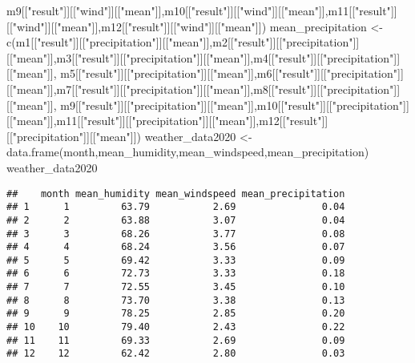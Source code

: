 \documentclass[
]{article}
\newenvironment{Shaded}{\begin{snugshade}}{\end{snugshade}}
\newcommand{\FunctionTok}[1]{\textcolor[rgb]{0.00,0.00,0.00}{#1}}
\newcommand{\NormalTok}[1]{#1}
\newcommand{\OtherTok}[1]{\textcolor[rgb]{0.56,0.35,0.01}{#1}}
\newcommand{\StringTok}[1]{\textcolor[rgb]{0.31,0.60,0.02}{#1}}
\begin{document}
\begin{Shaded}
\begin{Highlighting}[]
\NormalTok{                   m9[[}\StringTok{"result"}\NormalTok{]][[}\StringTok{"wind"}\NormalTok{]][[}\StringTok{"mean"}\NormalTok{]],m10[[}\StringTok{"result"}\NormalTok{]][[}\StringTok{"wind"}\NormalTok{]][[}\StringTok{"mean"}\NormalTok{]],m11[[}\StringTok{"result"}\NormalTok{]][[}\StringTok{"wind"}\NormalTok{]][[}\StringTok{"mean"}\NormalTok{]],m12[[}\StringTok{"result"}\NormalTok{]][[}\StringTok{"wind"}\NormalTok{]][[}\StringTok{"mean"}\NormalTok{]])}
\NormalTok{mean\_precipitation }\OtherTok{\textless{}{-}} \FunctionTok{c}\NormalTok{(m1[[}\StringTok{"result"}\NormalTok{]][[}\StringTok{"precipitation"}\NormalTok{]][[}\StringTok{"mean"}\NormalTok{]],m2[[}\StringTok{"result"}\NormalTok{]][[}\StringTok{"precipitation"}\NormalTok{]][[}\StringTok{"mean"}\NormalTok{]],m3[[}\StringTok{"result"}\NormalTok{]][[}\StringTok{"precipitation"}\NormalTok{]][[}\StringTok{"mean"}\NormalTok{]],m4[[}\StringTok{"result"}\NormalTok{]][[}\StringTok{"precipitation"}\NormalTok{]][[}\StringTok{"mean"}\NormalTok{]],}
\NormalTok{                   m5[[}\StringTok{"result"}\NormalTok{]][[}\StringTok{"precipitation"}\NormalTok{]][[}\StringTok{"mean"}\NormalTok{]],m6[[}\StringTok{"result"}\NormalTok{]][[}\StringTok{"precipitation"}\NormalTok{]][[}\StringTok{"mean"}\NormalTok{]],m7[[}\StringTok{"result"}\NormalTok{]][[}\StringTok{"precipitation"}\NormalTok{]][[}\StringTok{"mean"}\NormalTok{]],m8[[}\StringTok{"result"}\NormalTok{]][[}\StringTok{"precipitation"}\NormalTok{]][[}\StringTok{"mean"}\NormalTok{]],}
\NormalTok{                   m9[[}\StringTok{"result"}\NormalTok{]][[}\StringTok{"precipitation"}\NormalTok{]][[}\StringTok{"mean"}\NormalTok{]],m10[[}\StringTok{"result"}\NormalTok{]][[}\StringTok{"precipitation"}\NormalTok{]][[}\StringTok{"mean"}\NormalTok{]],m11[[}\StringTok{"result"}\NormalTok{]][[}\StringTok{"precipitation"}\NormalTok{]][[}\StringTok{"mean"}\NormalTok{]],m12[[}\StringTok{"result"}\NormalTok{]][[}\StringTok{"precipitation"}\NormalTok{]][[}\StringTok{"mean"}\NormalTok{]])}
\NormalTok{weather\_data2020 }\OtherTok{\textless{}{-}} \FunctionTok{data.frame}\NormalTok{(month,mean\_humidity,mean\_windspeed,mean\_precipitation)}
\NormalTok{weather\_data2020}
\end{Highlighting}
\end{Shaded}

\begin{verbatim}
##    month mean_humidity mean_windspeed mean_precipitation
## 1      1         63.79           2.69               0.04
## 2      2         63.88           3.07               0.04
## 3      3         68.26           3.77               0.08
## 4      4         68.24           3.56               0.07
## 5      5         69.42           3.33               0.09
## 6      6         72.73           3.33               0.18
## 7      7         72.55           3.45               0.10
## 8      8         73.70           3.38               0.13
## 9      9         78.25           2.85               0.20
## 10    10         79.40           2.43               0.22
## 11    11         69.33           2.69               0.09
## 12    12         62.42           2.80               0.03
\end{verbatim}
\end{document}
